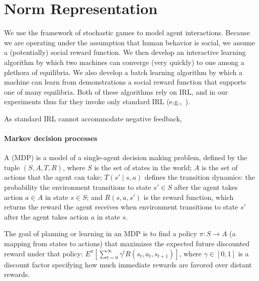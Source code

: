 
\section{Norm Representation}
\label{sec:representation}

We use the framework of stochastic games to model agent interactions.
Because we are operating under the assumption that human behavior is
social, we assume a (potentially) social reward function.  We then
develop an interactive learning algorithm by which two machines can
converge (very quickly) to one among a plethora of equilibria.  We
also develop a batch learning algorithm by which a machine can learn
from demonstrations a social reward function that supports one of many
equilibria.  Both of these algorithms rely on IRL, and in our
experiments thus far they invoke only standard IRL (e.g.,~\cite{MLIRL, BIRL}).

As standard IRL cannot accommodate negative feedback,


\paragraph{Markov decision processes}

A  (MDP) is a model of a single-agent
decision making problem, defined by the tuple $(S, A, T, R)$, where
$S$ is the set of states in the world; $A$ is the set of actions that
the agent can take; $T(s' \mid s, a)$ defines the transition dynamics:
the probability the environment transitions to state $s' \in S$
after the agent takes action $a \in A$ in state $s \in S$; and 
$R(s, a, s')$ is the reward function, which returns the reward the
agent receives when environment transitions to state $s'$ after the
agent takes action $a$ in state $s$.

The goal of planning or learning in an MDP is to find a policy $\pi :
S \rightarrow A$ (a mapping from states to actions) that maximizes the
expected future discounted reward under that policy: $E^{\pi} \left[
  \sum_{t=0}^\infty \gamma^t R(s_t, a_t, s_{t+1}) \right]$, where
$\gamma \in [0, 1]$ is a discount factor specifying how much immediate
rewards are favored over distant rewards. 

